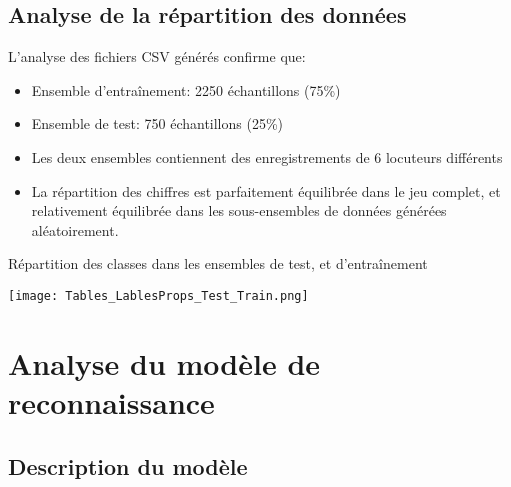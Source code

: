 \documentclass[11pt,a4paper]{article}
\begin{document}
\subsection{Analyse de la répartition des données}
\label{subsec:analyse_repartition}

L'analyse des fichiers CSV générés confirme que:
\begin{itemize}
    \item Ensemble d'entraînement: 2250 échantillons (75\%)
    \item Ensemble de test: 750 échantillons (25\%)
    \item Les deux ensembles contiennent des enregistrements de 6 locuteurs différents
    \item La répartition des chiffres est parfaitement équilibrée dans le jeu complet, et relativement équilibrée dans les sous-ensembles de données générées aléatoirement. 
\end{itemize}

\begin{table}[H]
    \centering
    \caption{Répartition des classes dans les ensembles de test, et d'entraînement}
    \label{tab:repartition}
    \texttt{[image: Tables\_LablesProps\_Test\_Train.png]}
\end{table}


\section{Analyse du modèle de reconnaissance}
\label{sec:analyse_modele}

\subsection{Description du modèle}
\label{subsec:description_modele}
\end{document}
